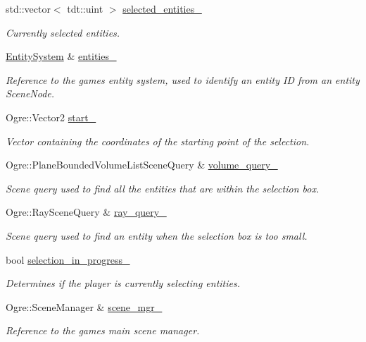\begin{DoxyCompactItemize}
\item 
std\+::vector$<$ tdt\+::uint $>$ \hyperlink{class_selection_box_a47f43b49a4eeab82ac9c0423b689d8c7}{selected\+\_\+entities\+\_\+}
\begin{DoxyCompactList}\small\item\em Currently selected entities. \end{DoxyCompactList}\item 
\hyperlink{class_entity_system}{Entity\+System} \& \hyperlink{class_selection_box_ac0e69cb5092894d810d6084ab9daf305}{entities\+\_\+}
\begin{DoxyCompactList}\small\item\em Reference to the game\textquotesingle{}s entity system, used to identify an entity ID from an entity Scene\+Node. \end{DoxyCompactList}\item 
Ogre\+::\+Vector2 \hyperlink{class_selection_box_a972855bf908b9a6a5048b3fb842dc769}{start\+\_\+}
\begin{DoxyCompactList}\small\item\em Vector containing the coordinates of the starting point of the selection. \end{DoxyCompactList}\item 
Ogre\+::\+Plane\+Bounded\+Volume\+List\+Scene\+Query \& \hyperlink{class_selection_box_a2218879b200ef6b963ea834d38010831}{volume\+\_\+query\+\_\+}
\begin{DoxyCompactList}\small\item\em Scene query used to find all the entities that are within the selection box. \end{DoxyCompactList}\item 
Ogre\+::\+Ray\+Scene\+Query \& \hyperlink{class_selection_box_a3ff14222f216c6d97f2a1fd7da76f96a}{ray\+\_\+query\+\_\+}
\begin{DoxyCompactList}\small\item\em Scene query used to find an entity when the selection box is too small. \end{DoxyCompactList}\item 
bool \hyperlink{class_selection_box_ae814ae0409771480132a038d4082fe97}{selection\+\_\+in\+\_\+progress\+\_\+}
\begin{DoxyCompactList}\small\item\em Determines if the player is currently selecting entities. \end{DoxyCompactList}\item 
Ogre\+::\+Scene\+Manager \& \hyperlink{class_selection_box_a4b844958cbf4e43926e44508c62476af}{scene\+\_\+mgr\+\_\+}
\begin{DoxyCompactList}\small\item\em Reference to the game\textquotesingle{}s main scene manager. \end{DoxyCompactList}\end{DoxyCompactItemize}


